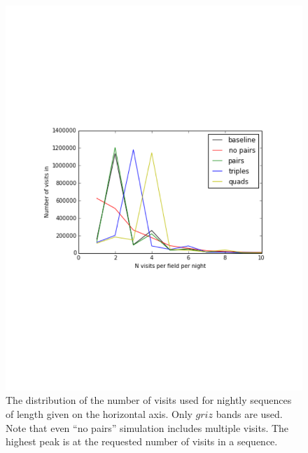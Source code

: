 \begin{figure}[t!]
\vskip -2.5in
\includegraphics[angle=0,width=0.99\hsize:,clip]{figs/NvisitStats.pdf}
\vskip -2.7in
\caption{The distribution of the number of visits used for nightly sequences of
length given on the horizontal axis. Only $griz$ bands are used. Note that even
``no pairs'' simulation includes multiple visits. The highest peak is at the
requested number of visits in a sequence.}
\label{fig:NvisitStats}
\end{figure}



